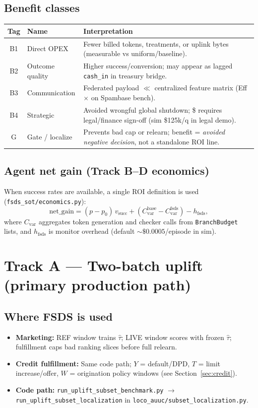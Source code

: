 \documentclass[11pt]{article}
\begin{document}
\subsection{Benefit classes}
\begin{center}
\begin{tabular}{@{}clp{}@{}}
\toprule
Tag & Name & Interpretation \\
\midrule
B1 & Direct OPEX & Fewer billed tokens, treatments, or uplink bytes (measurable vs uniform/baseline). \\
B2 & Outcome quality & Higher success/conversion; may appear as lagged \texttt{cash\_in} in treasury bridge. \\
B3 & Communication & Federated payload $\ll$ centralized feature matrix (Eff $\times$ on Spambase bench). \\
B4 & Strategic & Avoided wrongful global shutdown; \$ requires legal/finance sign-off (sim \$125k/q in legal demo). \\
G & Gate / localize & Prevents bad cap or relearn; benefit = \emph{avoided negative decision}, not a standalone ROI line. \\
\bottomrule
\end{tabular}
\end{center}

\subsection{Agent net gain (Track B--D economics)}
When success rates are available, a single ROI definition is used (\texttt{fsds\_sot/economics.py}):
\begin{equation}
\label{eq:netgain}
\mathrm{net\_gain}
= (p - p_0)\, v_{\mathrm{succ}}
+ (C^{\mathrm{base}}_{\mathrm{var}} - C^{\mathrm{fsds}}_{\mathrm{var}})
- h_{\mathrm{fsds}},
\end{equation}
where $C_{\mathrm{var}}$ aggregates token generation and checker calls from \texttt{BranchBudget} lists, and $h_{\mathrm{fsds}}$ is monitor overhead (default $\sim\$0.0005$/episode in sim).

\section{Track A --- Two-batch uplift (primary production path)}

\subsection{Where FSDS is used}
\begin{itemize}[nosep]
  \item \textbf{Marketing:} REF window trains $\hat\tau$; LIVE window scores with frozen $\hat\tau$; fulfillment caps bad ranking slices before full relearn.
  \item \textbf{Credit fulfillment:} Same code path; $Y$ = default/DPD, $T$ = limit increase/offer, $W$ = origination policy windows (see Section~\ref{sec:credit}).
  \item \textbf{Code path:} \texttt{run\_uplift\_subset\_benchmark.py} $\rightarrow$ \texttt{run\_uplift\_subset\_localization} in \texttt{loco\_auuc/subset\_localization.py}.
\end{itemize}
\end{document}
